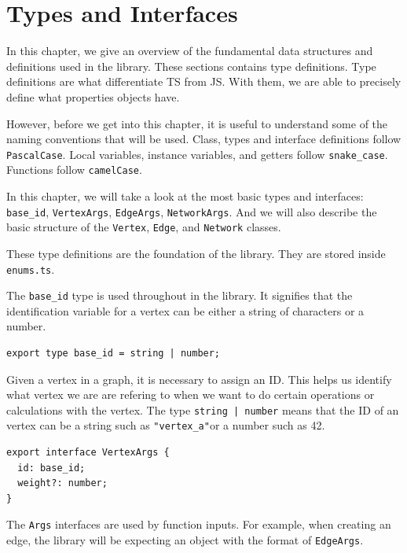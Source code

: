\chapter{Types and Interfaces}

In this chapter, we give an overview of the fundamental 
data structures and definitions used in the library.
These sections contains type definitions.
Type definitions are what differentiate TS from JS.
With them, we are able to precisely define what properties objects have.

However, before we get into this chapter,
it is useful to understand some of the naming conventions
that will be used.
Class, types and interface definitions follow \texttt{PascalCase}.
Local variables, instance variables,
and getters follow \texttt{snake_case}.
Functions follow \texttt{camelCase}.

In this chapter, we will take a look at the most basic
types and interfaces:
\texttt{base_id}, \texttt{VertexArgs},
\texttt{EdgeArgs}, \texttt{NetworkArgs}.
And we will also describe the basic structure of the \texttt{Vertex},
\texttt{Edge}, and \texttt{Network} classes.

These type definitions are the foundation of the library.
They are stored inside \texttt{enums.ts}.

The \texttt{base_id} type is used throughout in the library.
It signifies that the identification variable for a vertex can be either
a string of characters or a number.

\begin{verbatim}
export type base_id = string | number;
\end{verbatim}

Given a vertex in a graph, it is necessary to assign an ID.
This helps us identify what vertex we are are refering to when we
want to do certain operations or calculations with the vertex.
The type \texttt{string | number} means that the ID of an vertex
can be a string such as \texttt{"vertex_a"}or a number such as 42.

\begin{verbatim}
export interface VertexArgs {
  id: base_id;
  weight?: number;
}
\end{verbatim}

The \texttt{Args} interfaces are used by function inputs.
For example, when creating an edge,
the library will be expecting an object with the format of \texttt{EdgeArgs}.

